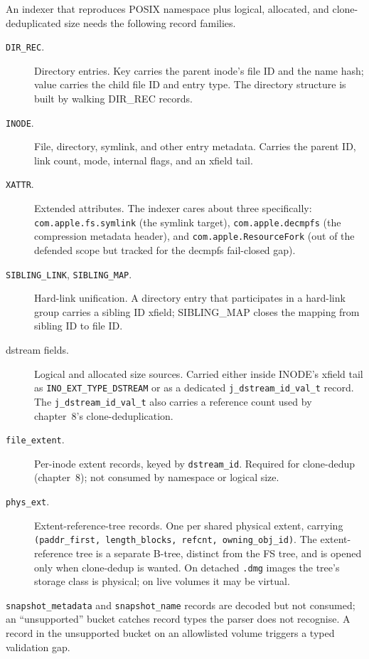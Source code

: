 An indexer that reproduces POSIX namespace plus logical, allocated,
and clone-deduplicated size needs the following record families.

\begin{description}
  \item[\texttt{DIR\_REC}.] Directory entries. Key carries the parent
    inode's file ID and the name hash; value carries the child file
    ID and entry type. The directory structure is built by walking
    DIR\_REC records.
  \item[\texttt{INODE}.] File, directory, symlink, and other entry
    metadata. Carries the parent ID, link count, mode, internal
    flags, and an xfield tail.
  \item[\texttt{XATTR}.] Extended attributes. The indexer cares about
    three specifically: \texttt{com.apple.fs.symlink} (the symlink
    target), \texttt{com.apple.decmpfs} (the compression metadata
    header), and \texttt{com.apple.ResourceFork} (out of the
    defended scope but tracked for the decmpfs fail-closed gap).
  \item[\texttt{SIBLING\_LINK}, \texttt{SIBLING\_MAP}.] Hard-link
    unification. A directory entry that participates in a hard-link
    group carries a sibling ID xfield; SIBLING\_MAP closes the
    mapping from sibling ID to file ID.
  \item[dstream fields.] Logical and allocated size sources.
    Carried either inside INODE's xfield tail as
    \texttt{INO\_EXT\_TYPE\_DSTREAM} or as a dedicated
    \texttt{j\_dstream\_id\_val\_t} record. The
    \texttt{j\_dstream\_id\_val\_t} also carries a reference count
    used by chapter~8's clone-deduplication.
  \item[\texttt{file\_extent}.] Per-inode extent records,
    keyed by \texttt{dstream\_id}. Required for clone-dedup
    (chapter~8); not consumed by namespace or logical size.
  \item[\texttt{phys\_ext}.] Extent-reference-tree records.
    One per shared physical extent, carrying
    \texttt{(paddr\_first, length\_blocks, refcnt,
    owning\_obj\_id)}. The extent-reference tree is a separate
    B-tree, distinct from the FS tree, and is opened only when
    clone-dedup is wanted. On detached \texttt{.dmg} images the
    tree's storage class is physical; on live volumes it may be
    virtual.
\end{description}

\texttt{snapshot\_metadata} and \texttt{snapshot\_name} records are
decoded but not consumed; an ``unsupported'' bucket catches record
types the parser does not recognise. A record in the unsupported
bucket on an allowlisted volume triggers a typed validation gap.

